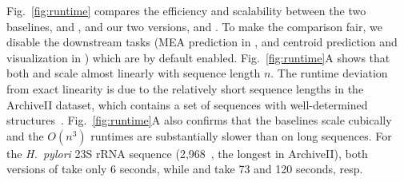 Fig.~\ref{fig:runtime} compares the efficiency and scalability between the two baselines, 
\viennarnafold and \contrafold,
and our two versions, \linearpartitionv and \linearpartitionc.
To make the comparison fair, 
we disable the downstream tasks
(MEA prediction in \contrafold, and centroid prediction and visualization in \rnafold)
which are by default enabled.
Fig.~\ref{fig:runtime}A shows that both \linearpartitionv and \linearpartitionc
scale almost linearly with sequence length $n$.
The runtime deviation from exact linearity is due to the relatively short sequence lengths in the ArchiveII dataset, 
which contains a set of sequences with well-determined structures~\cite{sloma+mathews:2016}. 
Fig.~\ref{fig:runtime}A also confirms that the baselines scale cubically and the $O(n^3)$ runtimes are substantially slower than \linearpartition on long sequences. 
For the {\it H.~pylori} 23S rRNA sequence (2,968~\nts, the longest in ArchiveII), 
both versions of \linearpartition  take only 6 seconds,
while \rnafold and \contrafold take 73 and 120 seconds, resp.


